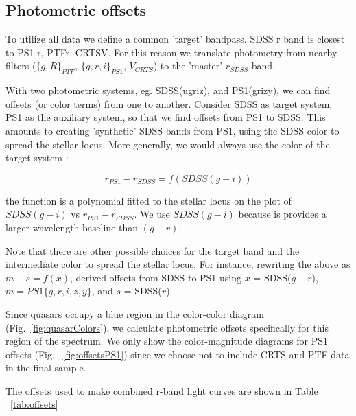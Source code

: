 \documentclass[twocolumn]{aastex62}
\begin{document}
\subsection{Photometric offsets}

To utilize all data we define a common 'target' bandpass. SDSS r band is closest to PS1 r, PTFr, CRTSV. For this reason we translate photometry from nearby filters ($\{g,R\}_{PTF}$, $\{g,r,i\}_{PS1}$, $V_{CRTS}$) to the  'master' $r_{SDSS}$  band.

With two photometric systems, eg. SDSS(ugriz), and PS1(grizy),  we can find offsets (or color terms) from one to another. Consider SDSS as target system,  PS1 as the auxiliary system, so that we find offsets from PS1 to SDSS. This amounts to creating 'synthetic' SDSS bands from PS1, using the SDSS color to spread the stellar locus. More generally, we would always use the color of the target system : 

\begin{equation}
r_{PS1} -  r_{SDSS} = f ( SDSS (g-i ))
\end{equation}

the function is a polynomial fitted to the stellar locus on the plot of $SDSS (g-i )$ vs $r_{PS1} -  r_{SDSS} $. We use $SDSS(g-i)$ because is provides a larger wavelength baseline than $(g-r)$. 

Note that there are other possible choices for the target band and the intermediate color to spread the stellar locus. For instance, rewriting the above as  $m - s = f(x)$, \cite{tonry2012} derived offsets from SDSS to PS1  using $x$ = SDSS($g-r$), $m = PS1 \{g,r,i,z,y\}$, and $s$ = SDSS($r$).

Since quasars occupy a blue region in the color-color diagram (Fig.~\ref{fig:quasarColors}), we calculate photometric offsets specifically for this region of the spectrum.  We only show the color-magnitude diagrams  for PS1 offsets  (Fig. ~\ref{fig:offsetsPS1}) since we choose not to include CRTS and PTF data in the final sample.

The offsets used to make combined r-band light curves are shown in Table ~\ref{tab:offsets}
\end{document}
